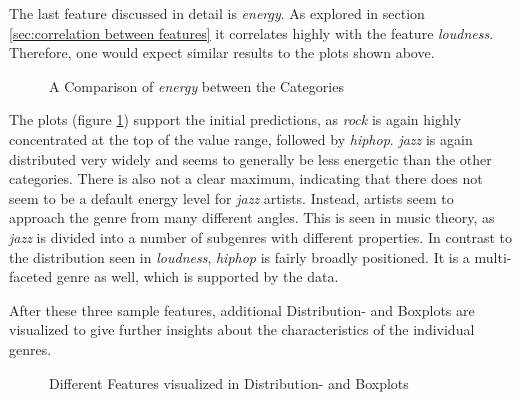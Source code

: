 The last feature discussed in detail is \emph{energy}.
As explored in section \ref{sec:correlation between features} it correlates highly with the feature \emph{loudness}.
Therefore, one would expect similar results to the plots shown above.

\begin{figure}[H]
    \centering
    \qquad
    \caption{A Comparison of \emph{energy} between the Categories}%
    \label{fig:du_dp_bp_enrg_categorie_dependent}%
\end{figure}

The plots (figure \ref{fig:du_dp_bp_enrg_categorie_dependent}) support the initial predictions, as \emph{rock} is again highly concentrated at the top of
the value range, followed by \emph{hiphop}. \emph{jazz} is again distributed very widely and
seems to generally be less energetic than the other categories. There is also not a clear maximum,
indicating that there does not seem to be a default energy level for \emph{jazz} artists.
Instead, artists seem to approach the genre from many different angles. This is seen in music
theory, as \emph{jazz} is divided into a number of subgenres with different properties.
In contrast to the distribution seen in \emph{loudness}, \emph{hiphop} is fairly broadly positioned.
It is a multi-faceted genre as well, which is supported by the data.

After these three sample features, additional Distribution- and Boxplots are visualized
to give further insights about the characteristics of the individual genres.

\begin{figure}[H]
    \centering
    \qquad
    \qquad
    \qquad
    \qquad
    \qquad
    \qquad
    \qquad
    \caption{Different Features visualized in Distribution- and Boxplots}%
    \label{fig:other exploration plots}%
\end{figure}